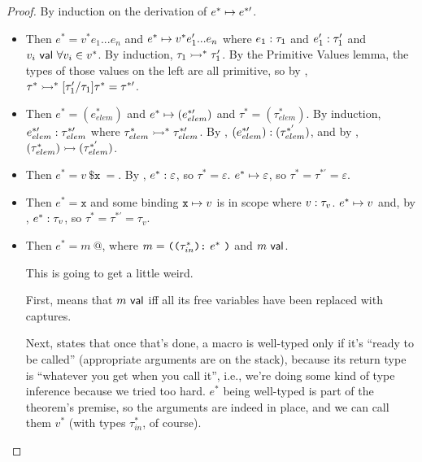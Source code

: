 \documentclass{article}
\begin{document}
\begin{proof}
By induction on the derivation of $e^* \mapsto e^{*\prime}$.
\begin{itemize}
    \item {}
        Then $e^* = v^* e_1 ... e_n$ and $e^* \mapsto v^* e_1' ... e_n$ where $e_1 : \tau_1$ and $e_1' : \tau_1'$ and $v_i ~\mathsf{val}~ \forall v_i \in v^*$.
        By induction, $\tau_1 \rightarrowtail^* \tau_1'$.
        By the Primitive Values lemma, the types of those values on the left are all primitive, so by , $\tau^* \rightarrowtail^* [\tau_1' / \tau_1]\tau^* = \tau^{*\prime}$.
    
    \item {}
        Then $e^* = (e_{elem}^*)$ and $e^* \mapsto (e_{elem}^{*\prime})$ and $\tau^* = (\tau_{elem}^*)$.
        By induction, $e_{elem}^{*\prime} : \tau_{elem}^{*\prime}$ where $\tau_{elem}^* \rightarrowtail^* \tau_{elem}^{*\prime}$. By , $(e_{elem}^{*\prime}) : (\tau_{elem}^{*'})$, and by , $(\tau_{elem}^*) \rightarrowtail (\tau_{elem}^{*'})$.
        
    \item {}
        Then $e^* = v ~ \texttt{\$x} ~ =$. By , $e^* : \varepsilon$, so $\tau^* = \varepsilon$. $e^* \mapsto \varepsilon$, so $\tau^* = \tau^{*\prime} = \varepsilon$.

    \item {}
        Then $e^* = \texttt{x}$ and some binding $\texttt{x} \mapsto v$ is in scope where $v : \tau_v$. $e^* \mapsto v$ and, by , $e^* : \tau_v$, so $\tau^* = \tau^{*\prime} = \tau_v$.
    
    \item {}
        Then $e^* = m ~\textbf{@}$, where $m = \texttt{((} \tau_{in}^* \texttt{):} ~ e^* ~ \texttt{)}$ and $m ~\mathsf{val}$.

        This is going to get a little weird.
        
        First,  means that $m ~\mathsf{val}$ iff all its free variables have been replaced with captures.
        
        Next,  states that once that's done, a macro is well-typed only if it's ``ready to be called'' (appropriate arguments are on the stack), because its return type is ``whatever you get when you call it'', i.e., we're doing some kind of type inference because we tried too hard.
        $e^*$ being well-typed is part of the theorem's premise, so the arguments are indeed in place, and we can call them $v^*$ (with types $\tau_{in}^*$, of course).
        

\end{itemize}
\end{proof}
\end{document}
